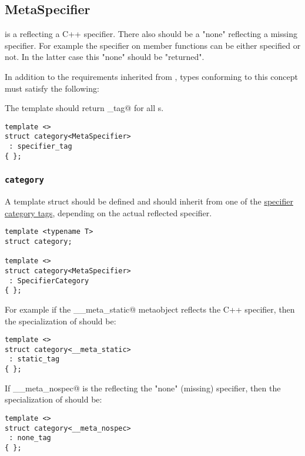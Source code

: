 \subsection{MetaSpecifier}
\label{concept-MetaSpecifier}

 is a  reflecting a C++ specifier. There also should be a "none"
 reflecting a missing specifier. For example the \verb@const@ specifier
on member functions can be either specified or not. In the latter case this "none" 
should be "returned".


In addition to the requirements inherited from , types conforming to this concept
must satisfy the following:

The \verb@category@ template should return \verb@specifier_tag@ for all s.

\begin{verbatim}
template <>
struct category<MetaSpecifier>
 : specifier_tag
{ };
\end{verbatim}

\subsubsection{\texttt{category}}

A template struct \verb@category@ should be defined and should inherit from one of the
\hyperref[specifier-category-tags]{specifier category tags}, depending on
the actual reflected specifier.

\begin{verbatim}
template <typename T>
struct category;

template <>
struct category<MetaSpecifier>
 : SpecifierCategory
{ };
\end{verbatim}

For example if the \verb@__meta_static@ metaobject reflects the \verb@static@
C++ specifier, then the specialization of \verb@category@
should be:

\begin{verbatim}
template <>
struct category<__meta_static>
 : static_tag
{ };
\end{verbatim}

If \verb@__meta_nospec@ is the  reflecting the "none" (missing) specifier,
then the specialization of \verb@category@ should be:

\begin{verbatim}
template <>
struct category<__meta_nospec>
 : none_tag
{ };
\end{verbatim}


